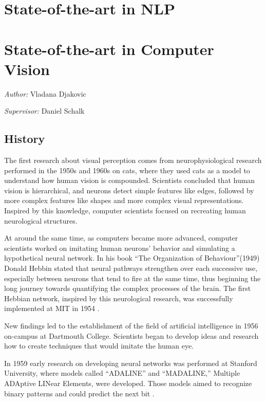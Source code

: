 \documentclass[
]{krantz}
\begin{document}
\hypertarget{c01-01-sota-nlp}{%
\section{State-of-the-art in NLP}\label{c01-01-sota-nlp}}

\hypertarget{c01-02-sota-cv}{%
\section{State-of-the-art in Computer Vision}\label{c01-02-sota-cv}}

\emph{Author: } Vladana Djakovic

\emph{Supervisor:} Daniel Schalk

\hypertarget{history}{%
\subsection{History}\label{history}}

The first research about visual perception comes from neurophysiological research performed in the 1950s and 1960s on cats, where they used cats as a model to understand how human vision is compounded. Scientists concluded that human vision is hierarchical, and neurons detect simple features like edges, followed by more complex features like shapes and more complex visual representations. Inspired by this knowledge, computer scientists focused on recreating human neurological structures.

At around the same time, as computers became more advanced, computer scientists worked on imitating human neurons' behavior and simulating a hypothetical neural network. In his book ``The Organization of Behaviour''(1949) Donald Hebbin stated that neural pathways strengthen over each successive use, especially between neurons that tend to fire at the same time, thus beginning the long journey towards quantifying the complex processes of the brain. The first Hebbian network, inspired by this neurological research, was successfully implemented at MIT in 1954 \citet{history1}.

New findings led to the establishment of the field of artificial intelligence in 1956 on-campus at Dartmouth College. Scientists began to develop ideas and research how to create techniques that would imitate the human eye.

In 1959 early research on developing neural networks was performed at Stanford University, where models called ``ADALINE'' and ``MADALINE,'' Multiple ADAptive LINear Elements, were developed. Those models aimed to recognize binary patterns and could predict the next bit \citet{history2}.
\end{document}

